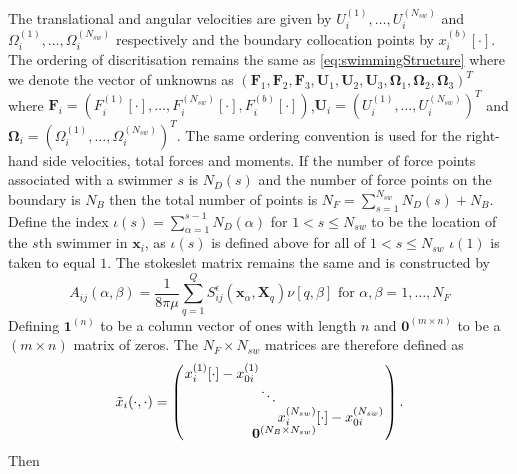 The translational and angular velocities are given by $U_i^{(1)},\dots,U_i^{(N_{sw})}$ and $\Omega_i^{(1)},\dots,\Omega_i^{(N_{sw})}$ respectively and the boundary collocation points by $x_i^{(b)}[\cdot]$. The ordering of discritisation remains the same as \cref{eq:swimmingStructure} where we denote the vector of unknowns as \newline $(\bm{F}_1, \bm{F}_2, \bm{F}_3, \bm{U}_1,\bm{U}_2,\bm{U}_3,\bm{\Omega}_1,\bm{\Omega}_2,\bm{\Omega}_3)^T$ where $\bm{F}_i = (F_i^{(1)}[\cdot],\dots,F_i^{(N_{sw})}[\cdot],F_i^{(b)}[\cdot])$,\newline $\bm{U}_i = (U_i^{(1)},\dots,U_i^{(N_{sw})})^T$ and $\bm{\Omega}_i = (\Omega_i^{(1)},\dots,\Omega_i^{(N_{sw})})^T$. The same ordering convention is used for the right-hand side velocities, total forces and moments. If the number of force points associated with a swimmer $s$ is $N_{D}(s)$ and the number of force points on the boundary is $N_B$ then the total number of points is $N_F=\sum_{s=1}^{N_{sw}} N_D(s) + N_B$. Define the index $\iota(s)=\sum_{\alpha=1}^{s-1}N_D(\alpha)$ for $1<s\leq N_{sw}$ to be the location of the $s$th swimmer in $\bm{x}_i$, as $\iota(s)$ is defined above for all of $1<s\leq N_{sw}$ $\iota(1)$ is taken to equal $1$. The stokeslet matrix remains the same and is constructed by
\begin{equation*}
    A_{ij}(\alpha,\beta) = \frac{1}{8\pi\mu} \sum_{q=1}^Q S_{ij}^\epsilon (\bm{x}_\alpha,\bm{X}_{q})\nu[q,\beta] \text { for } \alpha,\beta = 1,\dots,N_F
\end{equation*}
Defining $\bm{1}^{(n)}$ to be a column vector of ones with length $n$ and $\bm{0}^{(m\times n)}$ to be a $(m\times n)$ matrix of zeros. The $N_F \times N_{sw}$ matrices are therefore defined as
\begin{equation*}
\arraycolsep=0.4pt\def\arraystretch{0.8}
    \tilde{x}_i(\cdot,\cdot)=\left(\begin{array}{c}
         \begin{array}{ccc}
             x_i^{(1)}[\cdot]-x_{0i}^{(1)} & & \\
              & \ddots & \\
              & & x_i^{(N_{sw})}[\cdot]-x_{0i}^{(N_{sw})}
         \end{array}\\
         \bm{0}^{(N_B \times N_{sw})}
    \end{array}\right).
\end{equation*}
Then

